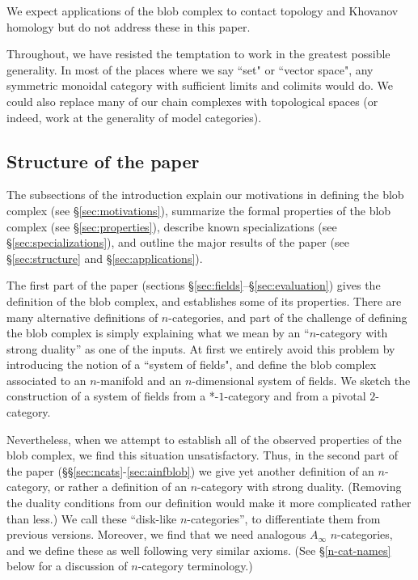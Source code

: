 We expect applications of the blob complex to contact topology and Khovanov homology 
but do not address these in this paper.

Throughout, we have resisted the temptation to work in the greatest possible generality.
In most of the places where we say ``set" or ``vector space", any symmetric monoidal category 
with sufficient limits and colimits would do.
We could also replace many of our chain complexes with topological spaces (or indeed, work at the generality of model categories).


\subsection{Structure of the paper}
The subsections of the introduction explain our motivations in defining the blob complex (see \S \ref{sec:motivations}), 
summarize the formal properties of the blob complex (see \S \ref{sec:properties}), 
describe known specializations (see \S \ref{sec:specializations}), 
and outline the major results of the paper (see \S \ref{sec:structure} and \S \ref{sec:applications}).

The first part of the paper (sections \S \ref{sec:fields}--\S \ref{sec:evaluation}) gives the definition of the blob complex, 
and establishes some of its properties.
There are many alternative definitions of $n$-categories, and part of the challenge of defining the blob complex is 
simply explaining what we mean by an ``$n$-category with strong duality'' as one of the inputs.
At first we entirely avoid this problem by introducing the notion of a ``system of fields", and define the blob complex 
associated to an $n$-manifold and an $n$-dimensional system of fields.
We sketch the construction of a system of fields from a *-$1$-category and from a pivotal $2$-category.

Nevertheless, when we attempt to establish all of the observed properties of the blob complex, 
we find this situation unsatisfactory.
Thus, in the second part of the paper (\S\S \ref{sec:ncats}-\ref{sec:ainfblob}) we give yet another 
definition of an $n$-category, or rather a definition of an $n$-category with strong duality.
(Removing the duality conditions from our definition would make it more complicated rather than less.) 
We call these ``disk-like $n$-categories'', to differentiate them from previous versions.
Moreover, we find that we need analogous $A_\infty$ $n$-categories, and we define these as well following very similar axioms.
(See \S \ref{n-cat-names} below for a discussion of $n$-category terminology.)

